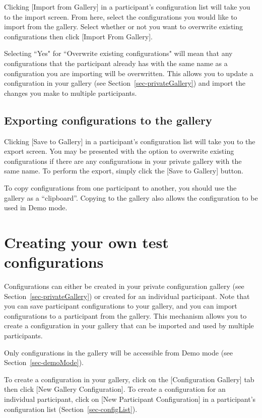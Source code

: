 \documentclass{article}
\begin{document}
Clicking [Import from Gallery] in a participant's configuration list will take you to the import screen. From here, select the configurations you would like to import from the gallery. Select whether or not you want to overwrite existing configurations then click [Import From Gallery].

Selecting ``Yes" for ``Overwrite existing configurations" will mean that any configurations that the participant already has with the same name as a configuration you are importing will be overwritten. This allows you to update a configuration in your gallery (see Section~\ref{sec-privateGallery}) and import the changes you make to multiple participants.

\subsection{Exporting configurations to the gallery}

Clicking [Save to Gallery] in a participant's configuration list will
take you to the export screen.
You may be presented with the option to overwrite existing
configurations if there are any configurations in your private gallery
with the same name.
To perform the export, simply click the [Save to Gallery] button.

To copy configurations from one participant to another, you should use the gallery as a ``clipboard''. Copying to the
gallery also allows the configuration to be used in Demo mode.


\section{Creating your own test configurations}
\label{sec-creatingConfigurations}

Configurations can either be created in your private configuration gallery (see Section~\ref{sec-privateGallery}) or created for an individual participant. Note that you can save participant configurations to your gallery, and you can import configurations to a participant from the gallery. This mechanism allows you to create a configuration in your gallery that can be imported and used by multiple participants.

Only configurations in the gallery will be accessible from Demo mode (see Section~\ref{sec-demoMode}).

To create a configuration in your gallery, click on the [Configuration Gallery] tab then click [New Gallery Configuration]. To create a configuration for an individual participant, click on [New Participant Configuration] in a participant's configuration list (Section~\ref{sec-configList}).
\end{document}
